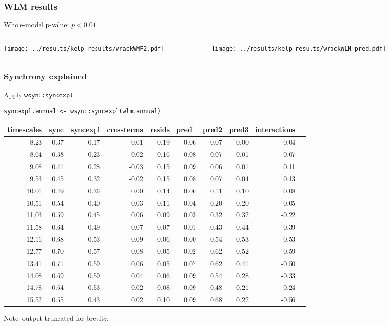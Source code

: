 \documentclass{beamer}
\begin{document}
\begin{frame}
\frametitle{WLM results}
Whole-model p-value: $p < 0.01$
\begin{columns}[c]
\begin{column}{6cm}
\texttt{[image: ../results/kelp\_results/wrackWMF2.pdf]}
\end{column}
\begin{column}{6cm}
\texttt{[image: ../results/kelp\_results/wrackWLM\_pred.pdf]}
\end{column}
\end{columns}
\end{frame}

\begin{frame}[fragile]
\frametitle{Synchrony explained}
\begin{exampleblock}{Apply \texttt{wsyn::syncexpl}}
\begin{verbatim}
syncexpl.annual <- wsyn::syncexpl(wlm.annual)
\end{verbatim}
\end{exampleblock}

\vspace{4pt}
\resizebox{10cm}{!}
{
\begin{tabular}{rrrrrrrrrr}
  \hline
 timescales & sync & syncexpl & crossterms & resids & pred1 & pred2 & pred3 & interactions\\ 
  \hline
  8.23 & 0.37 & 0.17 & 0.01 & 0.19 & 0.06 & 0.07 & 0.00 & 0.04 \\ 
  8.64 & 0.38 & 0.23 & -0.02 & 0.16 & 0.08 & 0.07 & 0.01 & 0.07 \\ 
  9.08 & 0.41 & 0.28 & -0.03 & 0.15 & 0.09 & 0.06 & 0.01 & 0.11 \\ 
  9.53 & 0.45 & 0.32 & -0.02 & 0.15 & 0.08 & 0.07 & 0.04 & 0.13 \\ 
  10.01 & 0.49 & 0.36 & -0.00 & 0.14 & 0.06 & 0.11 & 0.10 & 0.08 \\ 
  10.51 & 0.54 & 0.40 & 0.03 & 0.11 & 0.04 & 0.20 & 0.20 & -0.05 \\ 
  11.03 & 0.59 & 0.45 & 0.06 & 0.09 & 0.03 & 0.32 & 0.32 & -0.22 \\ 
  11.58 & 0.64 & 0.49 & 0.07 & 0.07 & 0.01 & 0.43 & 0.44 & -0.39 \\ 
  12.16 & 0.68 & 0.53 & 0.09 & 0.06 & 0.00 & 0.54 & 0.53 & -0.53 \\ 
  12.77 & 0.70 & 0.57 & 0.08 & 0.05 & 0.02 & 0.62 & 0.52 & -0.59 \\ 
  13.41 & 0.71 & 0.59 & 0.06 & 0.05 & 0.07 & 0.62 & 0.41 & -0.50 \\ 
  14.08 & 0.69 & 0.59 & 0.04 & 0.06 & 0.09 & 0.54 & 0.28 & -0.33 \\ 
  14.78 & 0.64 & 0.53 & 0.02 & 0.08 & 0.09 & 0.48 & 0.21 & -0.24 \\ 
  15.52 & 0.55 & 0.43 & 0.02 & 0.10 & 0.09 & 0.68 & 0.22 & -0.56 \\ 
   \hline
\end{tabular}
}
\vspace{1pt}
Note: output truncated for brevity.
\end{frame}
\end{document}
